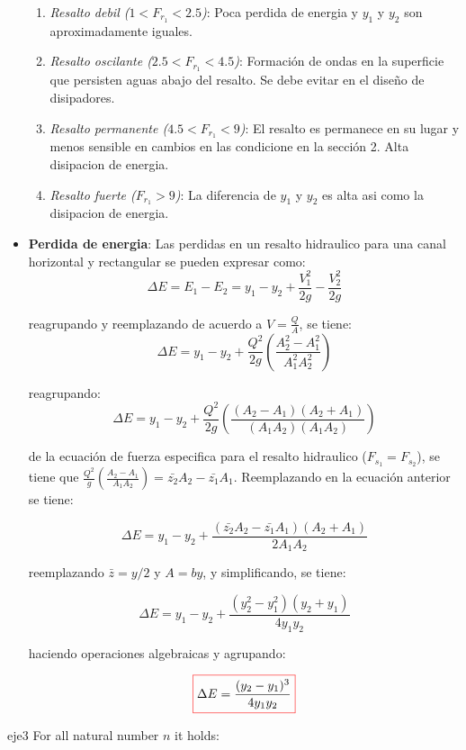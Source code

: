 \documentclass[11pt, oneside]{article}
\begin{document}
\begin{itemize}
\begin{enumerate}
\item \emph{Resalto debil ($1 < F_{r_1} < 2.5$)}: Poca perdida de energia y $y_1$ y $y_2$ son aproximadamente iguales.
\item \emph{Resalto oscilante ($2.5 < F_{r_1} < 4.5$)}: Formaci\'on de ondas en la superficie que persisten aguas abajo del resalto. Se debe evitar en el diseño de disipadores.
\item \emph{Resalto permanente ($4.5 < F_{r_1} < 9$)}: El resalto es permanece en su lugar y menos sensible en cambios en las condicione en la secci\'on 2. Alta disipacion de energia.
\item \emph{Resalto fuerte ($ F_{r_1} > 9$)}: La diferencia de $y_1$ y $y_2$ es alta asi como la disipacion de energia.
\end{enumerate}

\item \textbf{Perdida de energia}: Las perdidas en un resalto hidraulico para una canal horizontal y rectangular se pueden expresar como:
$$
\Delta E = E_1 - E_2 = y_1 - y_2 + \frac{V_1^2}{2g} - \frac{V_2^2}{2g}
$$

reagrupando y reemplazando de acuerdo a $V=\frac{Q}{A}$, se tiene:
$$
\Delta E = y_1 - y_2 + \frac{Q^2}{2g}\left(\frac{A_2^2 - A_1^2}{A_1^2 A_2^2} \right)
$$

reagrupando:
$$
\Delta E = y_1 - y_2 + \frac{Q^2}{2g}\left(\frac{(A_2 - A_1)(A_2 + A_1)}{(A_1 A_2)(A_1 A_2)} \right)
$$

de la ecuaci\'on de fuerza especifica para el resalto hidraulico ($F_{s_1} = F_{s_2}$), se tiene que $\frac{Q^2}{g} \left(\frac{A_2 - A_1}{A_1 A_2} \right) = \bar{z_2}A_2 - \bar{z_1}A_1 $. Reemplazando en la ecuaci\'on anterior se tiene:

$$
\Delta E = y_1 - y_2 + \frac{(\bar{z_2}A_2 - \bar{z_1}A_1) (A_2 + A_1)}{2 A_1 A_2}
$$

reemplazando $\bar{z}=y/2$ y $A=by$, y simplificando, se tiene:

$$
\Delta E = y_1 - y_2 + \frac{(y_2^2 - y_1^2) (y_2 + y_1)}{4 y_1 y_2}
$$

haciendo operaciones algebraicas y agrupando:

\begin{equation}
\color{red}\boxed{\color{black} \Delta E = \frac{(y_2 - y_1)^3}{4y_1 y_2}}
\label{ene23}
\end{equation}
\end{itemize}

\begin{eje}{}{eje3}
  For all natural number $n$ it holds:
\end{eje}


\end{document}
